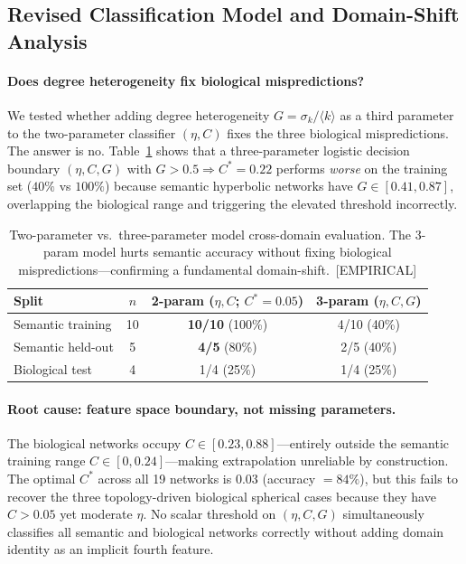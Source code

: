 \documentclass[11pt,a4paper]{article}
\begin{document}
\subsection{Revised Classification Model and Domain-Shift Analysis}
\label{sec:revised_model}

\paragraph{Does degree heterogeneity fix biological mispredictions?}
We tested whether adding degree heterogeneity $G = \sigma_k/\langle k\rangle$ as a third parameter to the two-parameter classifier $(\eta{}, C)$ fixes the three biological mispredictions. The answer is no. Table~\ref{tab:revised_model} shows that a three-parameter logistic decision boundary $(\eta{}, C, G)$ with $G>0.5 \Rightarrow C^* = 0.22$ performs \emph{worse} on the training set ($40\%$ vs $100\%$) because semantic hyperbolic networks have $G \in [0.41, 0.87]$, overlapping the biological range and triggering the elevated threshold incorrectly.

\begin{table}[h]
\centering
\small
\caption{Two-parameter vs.\ three-parameter model cross-domain evaluation. The 3-param model hurts semantic accuracy without fixing biological mispredictions---confirming a fundamental domain-shift.~[EMPIRICAL]}
\label{tab:revised_model}
\begin{tabular}{@{}lccc@{}}
\toprule
Split & $n$ & 2-param ($\eta,C$; $C^*=0.05$) & 3-param ($\eta,C,G$) \\
\midrule
Semantic training & 10 & \textbf{10/10} (100\%) & 4/10 (40\%) \\
Semantic held-out & 5  & \textbf{4/5}   (80\%)  & 2/5 (40\%) \\
Biological test   & 4  & 1/4   (25\%)  & 1/4 (25\%) \\
\bottomrule
\end{tabular}
\end{table}

\paragraph{Root cause: feature space boundary, not missing parameters.}
The biological networks occupy $C \in [0.23, 0.88]$---entirely outside the semantic training range $C \in [0, 0.24]$---making extrapolation unreliable by construction. The optimal $C^*$ across all 19 networks is $0.03$ (accuracy $= 84\%$), but this fails to recover the three topology-driven biological spherical cases because they have $C > 0.05$ yet moderate $\eta$. No scalar threshold on $(\eta{}, C, G)$ simultaneously classifies all semantic and biological networks correctly without adding domain identity as an implicit fourth feature.
\end{document}
